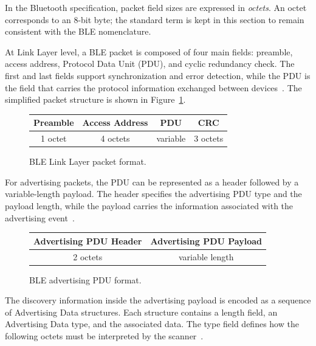 In the Bluetooth specification, packet field sizes are expressed in \emph{octets}. 
An octet corresponds to an 8-bit byte; the standard term is kept in this section to remain consistent with the BLE nomenclature.

At Link Layer level, a BLE packet is composed of four main fields: preamble, access address, Protocol Data Unit (PDU), and cyclic redundancy check. 
The first and last fields support synchronization and error detection, while the PDU is the field that carries the protocol information exchanged between devices~\cite{bluetooth_core_link_layer}. 
The simplified packet structure is shown in Figure~\ref{fig:ble_ll_packet_format}.

\begin{figure}[H]
	\centering
	\small
	\renewcommand{\arraystretch}{1.25}
	\begin{tabular}{|c|c|c|c|}
		\hline
		\textbf{Preamble} & \textbf{Access Address} & \textbf{PDU} & \textbf{CRC} \\
		\hline
		1 octet & 4 octets & variable & 3 octets \\
		\hline
	\end{tabular}
	\caption{BLE Link Layer packet format.}
	\label{fig:ble_ll_packet_format}
\end{figure}

For advertising packets, the PDU can be represented as a header followed by a variable-length payload. 
The header specifies the advertising PDU type and the payload length, while the payload carries the information associated with the advertising event~\cite{bluetooth_core_link_layer}.

\begin{figure}[H]
	\centering
	\small
	\renewcommand{\arraystretch}{1.25}
	\begin{tabular}{|c|c|}
		\hline
		\textbf{Advertising PDU Header} & \textbf{Advertising PDU Payload} \\
		\hline
		2 octets & variable length \\
		\hline
	\end{tabular}
	\caption{BLE advertising PDU format.}
	\label{fig:ble_adv_pdu_format}
\end{figure}

The discovery information inside the advertising payload is encoded as a sequence of Advertising Data structures. 
Each structure contains a length field, an Advertising Data type, and the associated data. 
The type field defines how the following octets must be interpreted by the scanner~\cite{bluetooth_css_data_types}.

